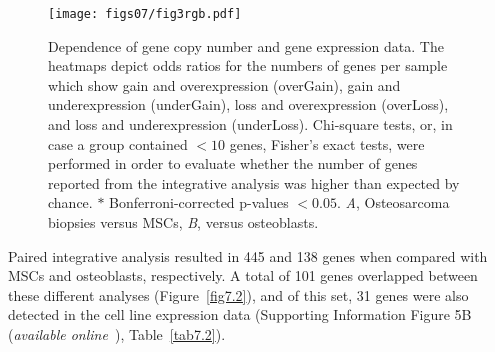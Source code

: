 \begin{figure}[htbp]
	\centering
	\texttt{[image: figs07/fig3rgb.pdf]}	%
	\caption{Dependence of gene copy number and gene expression data. The heatmaps depict odds ratios for the numbers of genes per sample which show gain and overexpression (overGain), gain and underexpression (underGain), loss and overexpression (overLoss), and loss and underexpression (underLoss). Chi-square tests, or, in case a group contained $<10$ genes, Fisher's exact tests, were performed in order to evaluate whether the number of genes reported from the integrative analysis was higher than expected by chance. $\ast$ Bonferroni\hyp{}corrected p-values $<0.05$. {\it A}, Osteosarcoma biopsies versus MSCs, {\it B}, versus osteoblasts.}
	\label{fig7.3}
\end{figure}
%
Paired integrative analysis resulted in
445 and 138 genes when compared with MSCs
and osteoblasts, respectively. A total of 101 genes
overlapped between these different analyses (Figure~\ref{fig7.2}), and of this set, 31 genes were also detected in
the cell line expression data (Supporting Information
Figure 5B ({\it available online}~\cite{ch7additional}), Table~\ref{tab7.2}).
%
